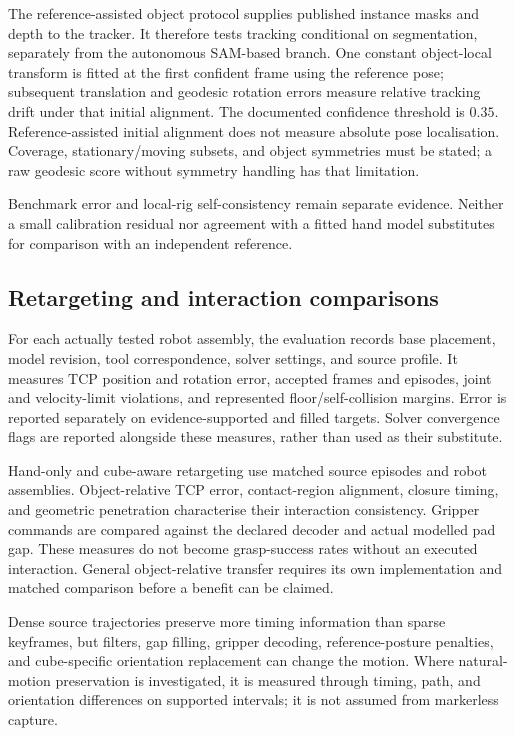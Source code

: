 The reference-assisted object protocol supplies published instance masks
and depth to the tracker. It therefore tests tracking conditional on
segmentation, separately from the autonomous SAM-based branch. One
constant object-local transform is fitted at the first confident frame
using the reference pose; subsequent translation and geodesic rotation
errors measure relative tracking drift under that initial alignment.
The documented confidence threshold is $0.35$. Reference-assisted initial
alignment does not measure absolute pose localisation. Coverage,
stationary/moving subsets, and object symmetries must be stated; a raw
geodesic score without symmetry handling has that limitation.

Benchmark error and local-rig self-consistency remain separate evidence.
Neither a small calibration residual nor agreement with a fitted hand
model substitutes for comparison with an independent reference.

\subsection{Retargeting and interaction comparisons}

For each actually tested robot assembly, the evaluation records base
placement, model revision, tool correspondence, solver settings, and
source profile. It measures TCP position and rotation error, accepted
frames and episodes, joint and velocity-limit violations, and represented
floor/self-collision margins. Error is reported separately on
evidence-supported and filled targets. Solver convergence flags are
reported alongside these measures, rather than used as their substitute.

Hand-only and cube-aware retargeting use matched source episodes and
robot assemblies. Object-relative TCP error, contact-region alignment,
closure timing, and geometric penetration characterise their interaction
consistency. Gripper commands are compared against the declared decoder
and actual modelled pad gap. These measures do not become grasp-success
rates without an executed interaction. General object-relative transfer
requires its own implementation and matched comparison before a benefit
can be claimed.

Dense source trajectories preserve more timing information than sparse
keyframes, but filters, gap filling, gripper decoding, reference-posture
penalties, and cube-specific orientation replacement can change the
motion. Where natural-motion preservation is investigated, it is measured
through timing, path, and orientation differences on supported intervals;
it is not assumed from markerless capture.

